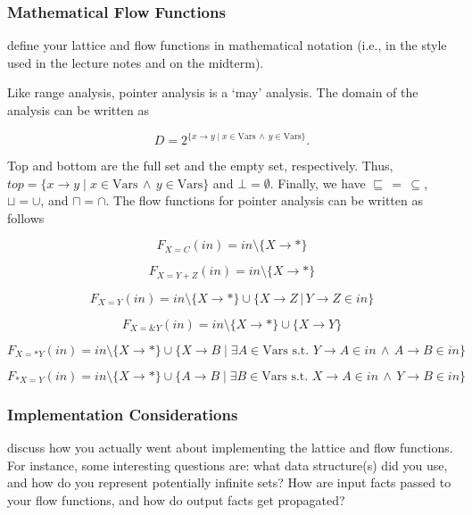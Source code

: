 \documentclass{article}
\theoremstyle{definition}
\begin{document}
\subsubsection{Mathematical Flow Functions}

\begin{framed}
  define your lattice and flow functions in mathematical notation
  (i.e., in the style used in the lecture notes and on the midterm).
\end{framed}
Like range analysis, pointer analysis is a `may' analysis. The domain of the analysis can be written as

\[ D = 2^{\{ x \rightarrow y \; |  \; x \in \text{Vars} \, \wedge \, y \in \text{Vars} \}}. \]

Top and bottom are the full set and the empty set, respectively. Thus, $top =\{ x \rightarrow y \; |  \; x \in \text{Vars} \, \wedge \, y \in \text{Vars} \}  $ and $\bot = \emptyset.$ Finally, we have $\sqsubseteq \, = \, \subseteq$, $\sqcup = \cup$, and $\sqcap = \cap$. The flow functions for pointer analysis can be written as follows

\[ F_{X = C}(in) = in \setminus \{ X \rightarrow * \} \]

\[ F_{X = Y + Z}(in) = in \setminus \{ X \rightarrow * \} \]

\[ F_{X = Y}(in) = in \setminus \{ X \rightarrow * \} \cup \{ X \rightarrow Z \, | \, Y \rightarrow Z \in in \}\]

\[ F_{X =  \& Y}(in) = in \setminus \{ X \rightarrow * \} \cup \{ X \rightarrow Y \}\]

\[ F_{X = *Y}(in) = in \setminus \{ X \rightarrow * \} \cup \{ X \rightarrow B \; | \; \exists A \in \text{Vars s.t. }  Y \rightarrow A \in in \, \wedge \, A \rightarrow B \in in \}\]

\[ F_{*X = Y}(in) = in \setminus \{ X \rightarrow * \} \cup \{ A \rightarrow B \; | \; \exists B \in \text{Vars s.t. } X \rightarrow A \in in \, \wedge \, Y \rightarrow B \in in\}\]


\subsubsection{Implementation Considerations}
\begin{framed}
  discuss how you actually went about implementing the lattice and
  flow functions. For instance, some interesting questions are: what
  data structure(s) did you use, and how do you represent potentially
  infinite sets? How are input facts passed to your flow functions,
  and how do output facts get propagated?
\end{framed}
\end{document}
